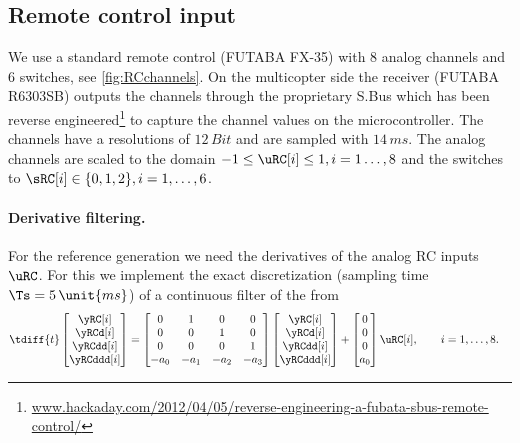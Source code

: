 \subsection{Remote control input}
We use a standard remote control (FUTABA FX-35) with 8 analog channels and 6 switches, see \autoref{fig:RCchannels}.
On the multicopter side the receiver (FUTABA R6303SB) outputs the channels through the proprietary S.Bus which has been reverse engineered\footnote{\url{www.hackaday.com/2012/04/05/reverse-engineering-a-fubata-sbus-remote-control/}} to capture the channel values on the microcontroller.
The channels have a resolutions of $12\,\unit{Bit}$ and are sampled with $14\,\unit{ms}$.
The analog channels are scaled to the domain $-1 \leq \uRC[i] \leq 1, i=1\ldots,8$ and the switches to $\sRC[i] \in \{0,1,2\}, i=1,\ldots,6$.

% 

\paragraph{Derivative filtering.}
For the reference generation we need the derivatives of the analog RC inputs $\uRC$.
For this we implement the exact discretization (sampling time $\Ts=5\,\unit{ms}$) of a continuous filter of the from
\begin{align}
 \tdiff{t} \begin{bmatrix} \yRC[i] \\ \yRCd[i] \\ \yRCdd[i] \\ \yRCddd[i] \end{bmatrix}
 &= \begin{bmatrix} 0 & 1 & 0 & 0 \\ 0 & 0 & 1 & 0 \\ 0 & 0 & 0 & 1 \\ -a_0 & -a_1 & -a_2 & -a_3 \end{bmatrix}
 \begin{bmatrix} \yRC[i] \\ \yRCd[i] \\ \yRCdd[i] \\ \yRCddd[i] \end{bmatrix}
 + \begin{bmatrix} 0 \\ 0 \\ 0 \\ a_0 \end{bmatrix}
 \uRC[i],
\qquad 
 i = 1,\ldots,8.
\end{align}

